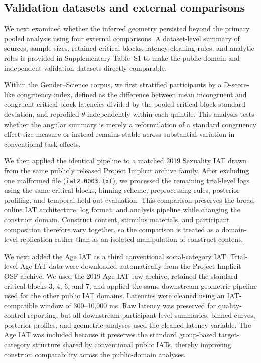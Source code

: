 \documentclass[12pt]{article}
\begin{document}
\subsection{Validation datasets and external comparisons}

We next examined whether the inferred geometry persisted beyond the primary pooled analysis using four external comparisons. A dataset-level summary of sources, sample sizes, retained critical blocks, latency-cleaning rules, and analytic roles is provided in Supplementary Table~S1 to make the public-domain and independent validation datasets directly comparable.

Within the Gender--Science corpus, we first stratified participants by a D-score-like congruency index, defined as the difference between mean incongruent and congruent critical-block latencies divided by the pooled critical-block standard deviation, and reprofiled $\theta$ independently within each quintile. This analysis tests whether the angular summary is merely a reformulation of a standard congruency effect-size measure or instead remains stable across substantial variation in conventional task effects.

We then applied the identical pipeline to a matched 2019 Sexuality IAT drawn from the same publicly released Project Implicit archive family. After excluding one malformed file (\texttt{iat2.0003.txt}), we processed the remaining trial-level logs using the same critical blocks, binning scheme, preprocessing rules, posterior profiling, and temporal hold-out evaluation. This comparison preserves the broad online IAT architecture, log format, and analysis pipeline while changing the construct domain. Construct content, stimulus materials, and participant composition therefore vary together, so the comparison is treated as a domain-level replication rather than as an isolated manipulation of construct content.

We next added the Age IAT as a third conventional social-category IAT. Trial-level Age IAT data were downloaded automatically from the Project Implicit OSF archive. We used the 2019 Age IAT raw archive, retained the standard critical blocks 3, 4, 6, and 7, and applied the same downstream geometric pipeline used for the other public IAT domains. Latencies were cleaned using an IAT-compatible window of 300--10{,}000 ms. Raw latency was preserved for quality-control reporting, but all downstream participant-level summaries, binned curves, posterior profiles, and geometric analyses used the cleaned latency variable. The Age IAT was included because it preserves the standard group-based target-category structure shared by conventional public IATs, thereby improving construct comparability across the public-domain analyses.
\end{document}
